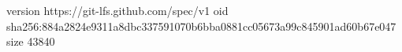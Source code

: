 version https://git-lfs.github.com/spec/v1
oid sha256:884a2824e9311a8dbc337591070b6bba0881cc05673a99c845901ad60b67e047
size 43840
